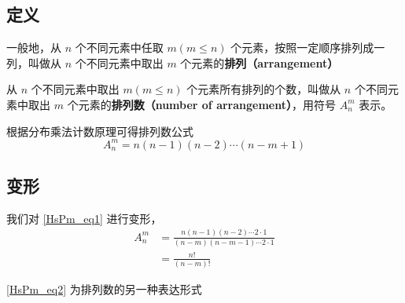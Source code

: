 
\begin{issues}
\end{issues}


\subsection{定义}
一般地，从 $n$ 个不同元素中任取 $m(m \leq n)$ 个元素，按照一定顺序排列成一列，叫做从 $n$ 个不同元素中取出 $m$ 个元素的\textbf{排列（arrangement）}

从 $n$ 个不同元素中取出 $m(m \leq n)$ 个元素所有排列的个数，叫做从 $n$ 个不同元素中取出 $m$ 个元素的\textbf{排列数（number of arrangement）}，用符号 $A_n^m$ 表示。

根据分布乘法计数原理可得排列数公式\begin{equation}\label{HsPm_eq1}
A_n^m = n (n - 1)(n - 2) \cdots (n - m + 1)
\end{equation}

\subsection{变形}
我们对 \autoref{HsPm_eq1} 进行变形，\begin{equation}\label{HsPm_eq2}
\begin{aligned}
A_n^m &= \frac{n(n - 1)(n - 2) \cdots 2 \cdot 1}{(n - m)(n - m - 1) \cdots 2 \cdot 1}\\
&= \frac{n!}{(n - m)!}
\end{aligned}
\end{equation}

\autoref{HsPm_eq2} 为排列数的另一种表达形式